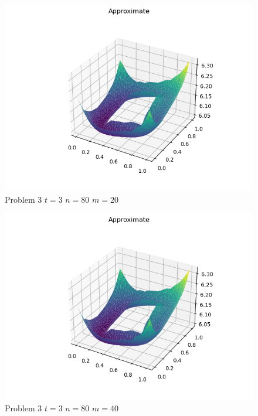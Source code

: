 \documentclass{report}
\begin{document}
\begin{figure}[h]
	\caption{Problem 3 $t = 3$ $n = 80$ $m = 20$}
	\includegraphics[width=\textwidth]{example.png}
\end{figure}
\begin{figure}[h]
	\caption{Problem 3 $t = 3$ $n = 80$ $m = 40$}
	\includegraphics[width=\textwidth]{example.png}
\end{figure}
\end{document}
